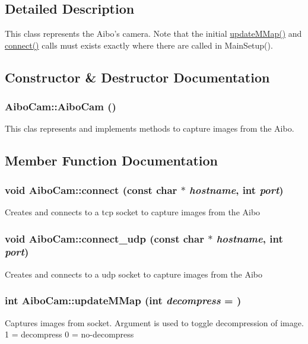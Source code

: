 \subsection{Detailed Description}
This class represents the Aibo's camera. Note that the initial \hyperlink{classAiboCam_a72162af9d25b9b24d6449d41b234f8b2}{updateMMap()} and \hyperlink{classAiboCam_ad75cf19864fb15ed89a616368d1ee200}{connect()} calls must exists exactly where there are called in MainSetup(). 

\subsection{Constructor \& Destructor Documentation}
\hypertarget{classAiboCam_a594411a1df57552aa2b9c609319c74d4}{
\subsubsection[{AiboCam}]{\setlength{\rightskip}{0pt plus 5cm}AiboCam::AiboCam ()}}
\label{classAiboCam_a594411a1df57552aa2b9c609319c74d4}
This clas represents and implements methods to capture images from the Aibo. 

\subsection{Member Function Documentation}
\hypertarget{classAiboCam_ad75cf19864fb15ed89a616368d1ee200}{
\subsubsection[{connect}]{\setlength{\rightskip}{0pt plus 5cm}void AiboCam::connect (const char $\ast$ {\em hostname}, \/  int {\em port})}}
\label{classAiboCam_ad75cf19864fb15ed89a616368d1ee200}
Creates and connects to a tcp socket to capture images from the Aibo \hypertarget{classAiboCam_a96cac8c22b3676e4bfd71651af3cf825}{
\subsubsection[{connect\_\-udp}]{\setlength{\rightskip}{0pt plus 5cm}void AiboCam::connect\_\-udp (const char $\ast$ {\em hostname}, \/  int {\em port})}}
\label{classAiboCam_a96cac8c22b3676e4bfd71651af3cf825}
Creates and connects to a udp socket to capture images from the Aibo \hypertarget{classAiboCam_a72162af9d25b9b24d6449d41b234f8b2}{
\subsubsection[{updateMMap}]{\setlength{\rightskip}{0pt plus 5cm}int AiboCam::updateMMap (int {\em decompress} = {})}}
\label{classAiboCam_a72162af9d25b9b24d6449d41b234f8b2}
Captures images from socket. Argument is used to toggle decompression of image. 1 = decompress 0 = no-\/decompress

